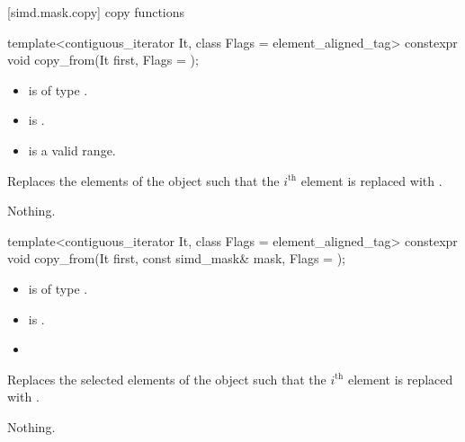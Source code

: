 [simd.mask.copy]{\texorpdfstring{ copy}{simd_mask copy} functions}

\begin{itemdecl}
template<contiguous_iterator It, class Flags = element_aligned_tag>
  constexpr void copy_from(It first, Flags = {});
\end{itemdecl}

\begin{itemdescr}
  \pnum\constraints
  \begin{itemize}
    \item {} is of type .
    \item {} is .
  \end{itemize}

  \pnum\requires
  \begin{itemize}
    \item \tcode{[first, first + size())} is a valid range.
  \end{itemize}

  \pnum\effects
  Replaces the elements of the  object such that the $i^\text{th}$ element is replaced with  \foralli.

  \pnum\throws Nothing.
\end{itemdescr}

\begin{itemdecl}
template<contiguous_iterator It, class Flags = element_aligned_tag>
  constexpr void copy_from(It first, const simd_mask& mask, Flags = {});
\end{itemdecl}

\begin{itemdescr}
  \pnum\constraints
  \begin{itemize}
    \item {} is of type .
    \item {} is .
  \end{itemize}

  \pnum\requires
  \begin{itemize}
    \item \validMaskedRange
  \end{itemize}

  \pnum\effects
  Replaces the selected elements of the  object such that the $i^\text{th}$ element is replaced with  \forallmaskedi.

  \pnum\throws Nothing.
\end{itemdescr}

